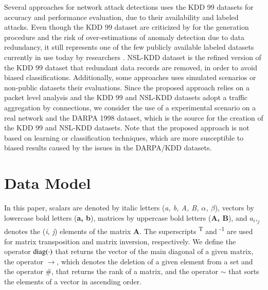 \documentclass[review]{elsarticle}
\begin{document}
Several approaches for network attack detections uses the KDD 99 \cite{ji2016multi,ahmed2016survey,osanaiye2016distributed,bhuyan2014network} datasets for accuracy and performance evaluation, due to their availability and labeled attacks. Even though the KDD 99 dataset are criticized by for the generation procedure and the risk of over-estimations of anomaly detection due to data redundancy, it still represents one of the few publicly available labeled datasets currently in use today by researchers \cite{osanaiye2016distributed,bhuyan2014network}. NSL-KDD \cite{tavallaee2009detailed} dataset is the refined version of the KDD 99 dataset that redundant data records are removed, in order to avoid biased classifications. Additionally, some approaches uses simulated \cite{callegari2011novel} scenarios or non-public datasets their evaluations. Since the proposed approach relies on a packet level analysis and the KDD 99 and NSL-KDD datasets adopt a traffic aggregation by connections, we consider the use of a experimental scenario on a real network and the DARPA 1998 dataset, which is the source for the creation of the KDD 99 and NSL-KDD datasets. Note that the proposed approach is not based on learning or classification techniques, which are more susceptible to biased results caused by the issues in the DARPA/KDD datasets.

\section{Data Model}
\label{sec:datamodel}

In this paper, scalars are denoted by italic letters (\emph{a, b, A, B, $α$, $β$}), vectors by lowercase bold letters (\textbf{a, b}), matrices by uppercase bold letters (\textbf{A, B}), and $a_i,_j$ denotes the (\emph{i, j}) elements of the matrix \textbf{A}. The superscripts \textsuperscript{T} and \textsuperscript{-1} are used for matrix transposition and matrix inversion, respectively. We define the operator $\rm diag(\cdot)$ that returns the vector of the main diagonal of a given matrix, the operator $\rightarrow$, which denotes the deletion of a given element from a set and the operator $\#$, that returns the rank of a matrix, and the operator $\sim$ that sorts the elements of a vector in ascending order.
\end{document}
